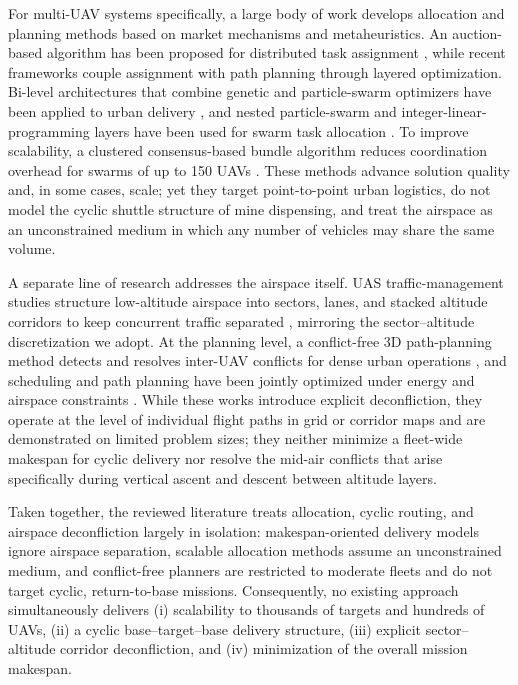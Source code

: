 \documentclass[subscriptcorrection,upint,nolists, varvw,barcolor=Goldenrod3,mathalfa=cal=euler,balance,hyphenate,french]{asmejour} %
\begin{document}
For multi-UAV systems specifically, a large body of work develops allocation and planning methods based on market mechanisms and metaheuristics. An auction-based algorithm has been proposed for distributed task assignment \cite{Duan2020}, while recent frameworks couple assignment with path planning through layered optimization. Bi-level architectures that combine genetic and particle-swarm optimizers have been applied to urban delivery \cite{Wen2025, Yang2025}, and nested particle-swarm and integer-linear-programming layers have been used for swarm task allocation \cite{Zeng2025}. To improve scalability, a clustered consensus-based bundle algorithm reduces coordination overhead for swarms of up to 150 UAVs \cite{Gan2026}. These methods advance solution quality and, in some cases, scale; yet they target point-to-point urban logistics, do not model the cyclic shuttle structure of mine dispensing, and treat the airspace as an unconstrained medium in which any number of vehicles may share the same volume.

A separate line of research addresses the airspace itself. UAS traffic-management studies structure low-altitude airspace into sectors, lanes, and stacked altitude corridors to keep concurrent traffic separated \cite{Lee2023}, mirroring the sector--altitude discretization we adopt. At the planning level, a conflict-free 3D path-planning method detects and resolves inter-UAV conflicts for dense urban operations \cite{Lu2025}, and scheduling and path planning have been jointly optimized under energy and airspace constraints \cite{Zhan2025}. While these works introduce explicit deconfliction, they operate at the level of individual flight paths in grid or corridor maps and are demonstrated on limited problem sizes; they neither minimize a fleet-wide makespan for cyclic delivery nor resolve the mid-air conflicts that arise specifically during vertical ascent and descent between altitude layers.

Taken together, the reviewed literature treats allocation, cyclic routing, and airspace deconfliction largely in isolation: makespan-oriented delivery models ignore airspace separation, scalable allocation methods assume an unconstrained medium, and conflict-free planners are restricted to moderate fleets and do not target cyclic, return-to-base missions. Consequently, no existing approach simultaneously delivers (i) scalability to thousands of targets and hundreds of UAVs, (ii) a cyclic base--target--base delivery structure, (iii) explicit sector--altitude corridor deconfliction, and (iv) minimization of the overall mission makespan.
\end{document}
